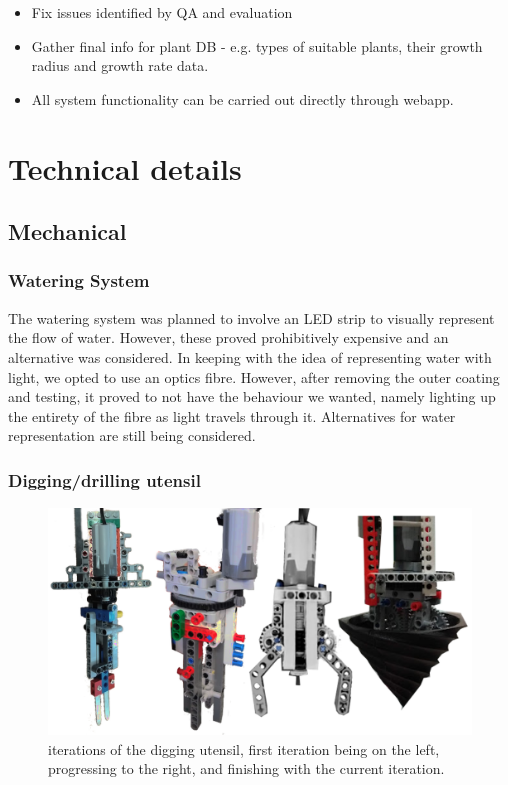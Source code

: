 \documentclass{article}
\begin{document}
\begin{itemize}
    \setlength\itemsep{0.01em}
    \setlength\parskip{0pt}
    \item Fix issues identified by QA and evaluation
    \item Gather final info for plant DB - e.g. types of suitable plants, their growth radius and growth rate data.
    \item All system functionality can be carried out directly through webapp.
\end{itemize}


\section{Technical details}

\subsection{Mechanical}

\subsubsection{Watering System}
The watering system was planned to involve an LED strip to visually represent the flow of water. However, these proved prohibitively expensive and an alternative was considered. In keeping with the idea of representing water with light, we opted to use an optics fibre. However, after removing the outer coating and testing, it proved to not have the behaviour we wanted, namely lighting up the entirety of the fibre as light travels through it. Alternatives for water representation are still being considered.

\subsubsection{Digging/drilling utensil}
\begin{figure}[h]
\begin{center}

\includegraphics[width=0.8\linewidth]{figs-demo3/drill-iters.png}

\caption{iterations of the digging utensil, first iteration being on the left, progressing to the right, and finishing with the current iteration. }
\label{fig:drills}
\end{center}
\vskip -4mm
\end{figure} 
\end{document}
